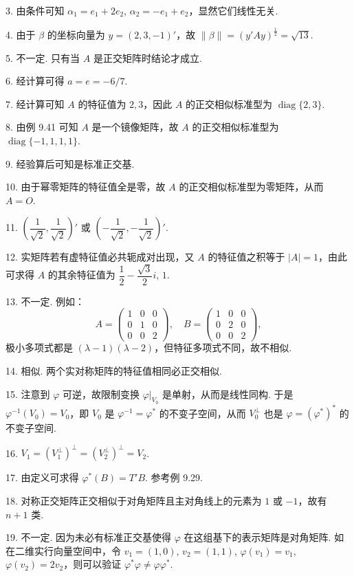 \documentclass[UTF8,12pt,a4paper,fontset=fandol]{ctexart}
\begin{document}
3. 由条件可知 $\alpha_1=e_1+2e_2$, $\alpha_2=-e_1+e_2$，显然它们线性无关.

4. 由于 $\beta$ 的坐标向量为 $y=(2,3,-1)'$，故 $\|\beta\|=(y'Ay)^{\frac{1}{2}}=\sqrt{13}$.

5. 不一定. 只有当 $A$ 是正交矩阵时结论才成立.

6. 经计算可得 $a=e=-6/7$.

7. 经计算可知 $A$ 的特征值为 $2,3$，因此 $A$ 的正交相似标准型为 $\operatorname{diag}\{2,3\}$.

8. 由例 9.41 可知 $A$ 是一个镜像矩阵，故 $A$ 的正交相似标准型为 $\operatorname{diag}\{-1,1,1,1\}$.

9. 经验算后可知是标准正交基.

10. 由于幂零矩阵的特征值全是零，故 $A$ 的正交相似标准型为零矩阵，从而 $A=O$.

11. $\left(\dfrac{1}{\sqrt{2}},\dfrac{1}{\sqrt{2}}\right)'$ 或 $\left(-\dfrac{1}{\sqrt{2}},-\dfrac{1}{\sqrt{2}}\right)'$.

12. 实矩阵若有虚特征值必共轭成对出现，又 $A$ 的特征值之积等于 $|A|=1$，由此可求得 $A$ 的其余特征值为 $\dfrac{1}{2}-\dfrac{\sqrt{3}}{2}i$, $1$.

13. 不一定. 例如：
\[
A=\begin{pmatrix}
1&0&0\\
0&1&0\\
0&0&2
\end{pmatrix},\quad
B=\begin{pmatrix}
1&0&0\\
0&2&0\\
0&0&2
\end{pmatrix},
\]
极小多项式都是 $(\lambda-1)(\lambda-2)$，但特征多项式不同，故不相似.

14. 相似. 两个实对称矩阵的特征值相同必正交相似.

15. 注意到 $\varphi$ 可逆，故限制变换 $\varphi|_{V_0}$ 是单射，从而是线性同构. 于是 $\varphi^{-1}(V_0)=V_0$，即 $V_0$ 是 $\varphi^{-1}=\varphi^*$ 的不变子空间，从而 $V_0^\perp$ 也是 $\varphi=(\varphi^*)^*$ 的不变子空间.

16. $V_1=(V_1^\perp)^\perp=(V_2^\perp)^\perp=V_2$.

17. 由定义可求得 $\varphi^*(B)=T'B$. 参考例 9.29.

18. 对称正交矩阵正交相似于对角矩阵且主对角线上的元素为 $1$ 或 $-1$，故有 $n+1$ 类.

19. 不一定. 因为未必有标准正交基使得 $\varphi$ 在这组基下的表示矩阵是对角矩阵. 如在二维实行向量空间中，令 $v_1=(1,0)$, $v_2=(1,1)$, $\varphi(v_1)=v_1$, $\varphi(v_2)=2v_2$，则可以验证 $\varphi^*\varphi\ne\varphi\varphi^*$.
\end{document}
